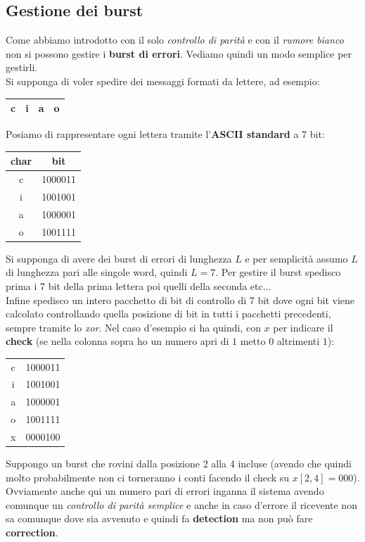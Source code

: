 \documentclass[a4paper,12pt, oneside]{book}
\begin{document}
\subsection{Gestione dei burst}
Come abbiamo introdotto con il solo \textit{controllo di parità} e con
il \textit{rumore bianco} non si possono gestire i \textbf{burst di
  errori}. Vediamo quindi un modo semplice per gestirli.\\
Si supponga di voler spedire dei messaggi formati da lettere, ad esempio:
\begin{table}[H]
  \centering
  \begin{tabular}{|c|c|c|c|}
    \hline
    c&i&a&o\\
    \hline
  \end{tabular}
\end{table}
Posiamo di rappresentare ogni lettera tramite l'\textbf{ASCII standard} a 7 bit:
\begin{table}[H]
  \centering
  \begin{tabular}{c|c}
    char & bit\\
    \hline
    c&1000011\\
    i&1001001\\
    a&1000001\\
    o&1001111
  \end{tabular}
\end{table}
Si supponga di avere dei burst di errori di lunghezza $L$ e per semplicità
assumo $L$ di lunghezza pari alle singole word, quindi $L=7$. Per gestire il
burst spedisco prima i 7 bit della prima lettera poi quelli della seconda
etc$\ldots$\\
Infine spedisco un intero pacchetto di bit di controllo di 7 bit dove ogni bit
viene calcolato controllando quella posizione di bit in tutti i pacchetti
precedenti, sempre tramite lo \textit{xor}. Nel caso d'esempio si ha quindi, con
$x$ per indicare il \textbf{check} (se nella colonna sopra ho un numero apri di
$1$ metto $0$ altrimenti $1$):
\begin{table}[H]
  \centering
  \begin{tabular}{c|c}
    c&1000011\\
    i&1001001\\
    a&1000001\\
    o&1001111\\
    \hline
    x&0000100\\
  \end{tabular}
\end{table}
Suppongo un burst che rovini dalla posizione 2 alla 4 incluse (avendo che quindi
molto probabilmente non ci torneranno i conti facendo il check su
$x[2,4]=000$).\\
Ovviamente anche qui un numero pari di errori inganna il sistema avendo comunque
un \textit{controllo di parità semplice} e anche in caso d'errore il ricevente
non sa comunque dove sia avvenuto e quindi fa \textbf{detection} ma non può fare
\textbf{correction}.
\end{document}
